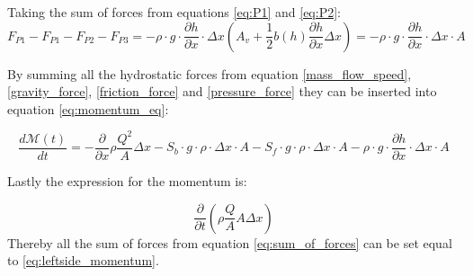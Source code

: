 Taking the sum of forces from equations \ref{eq:P1} and \ref{eq:P2}:
\begin{equation}
F_{P1} -F_{P1} -F_{P2} - F_{P3} =-\rho\cdot g \cdot \frac{\partial h}{\partial x} \cdot \Delta x \left(A_v + \frac{1}{2}b(h)\frac{\partial h}{\partial x} \Delta x \right) =-\rho\cdot g \cdot \frac{\partial h}{\partial x} \cdot \Delta x  \cdot A  
\label{pressure_force}
\end{equation}

By summing all the hydrostatic forces from equation \ref{mass_flow_speed}, \ref{gravity_force}, \ref{friction_force} and \ref{pressure_force} they can be inserted into equation \ref{eq:momentum_eq}:

\begin{equation}
\frac{d \mathcal{M}(t)}{dt}	=- \frac{\partial}{\partial x} \rho \frac{Q^2}{A}\Delta x
-S_b \cdot g \cdot \rho \cdot \Delta x \cdot A -S_f \cdot g \cdot \rho \cdot \Delta x \cdot A  -\rho\cdot g \cdot \frac{\partial h}{\partial x} \cdot \Delta x \cdot A
\label{eq:sum_of_forces}
\end{equation}

Lastly the expression for the momentum is:

\begin{equation}\label{eq:leftside_momentum}
	\frac{\partial}{\partial t} \left(\rho \frac{Q}{A}A\Delta x\right)
\end{equation}
Thereby all the sum of forces from equation \ref{eq:sum_of_forces} can be set equal to  \ref{eq:leftside_momentum}.%

